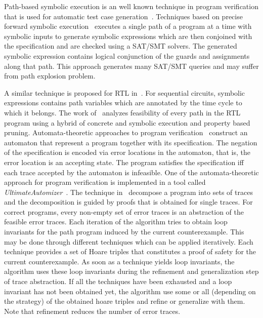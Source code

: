 %
Path-based symbolic execution is an well known technique in program verification 
that is used for automatic test case generation~\cite{DBLP:conf/osdi/CadarDE08}.
Techniques based on precise forward symbolic 
execution~\cite{DBLP:conf/osdi/CadarDE08, King:1976:SEP:360248.360252}
executes a single path of a program at a time with symbolic inputs 
to generate symbolic expressions which are then conjoined with
the specification and are checked using a SAT/SMT solvers. 
The generated symbolic expression contains logical conjunction 
of the guards and assignments along that path.  This approach generates many 
SAT/SMT queries and may suffer from path explosion problem.

A similar technique is proposed for RTL in~\cite{star}. 
For sequential circuits, symbolic expressions contains path variables which 
are annotated by the time cycle to which it belongs. The 
work of~\cite{DBLP:journals/todaes/LiuV14} analyzes 
feasibility of every path in the RTL program using a hybrid 
of concrete and symbolic execution and property based pruning.
%
%
Automata-theoretic approaches to program verification~\cite{DBLP:conf/cav/KupfermanV00,
DBLP:books/sp/cstoday95/Vardi95,DBLP:conf/cav/HeizmannHP13} construct 
an automaton that represent a program together with its specification.
The negation of the specification is encoded via error locations in the automaton, 
that is, the error location is an accepting state.  The program satisfies the 
specification iff each trace accepted by the automaton is infeasible.
%
One of the automata-theoretic approach for program verification 
is implemented in a tool called 
\emph{UltimateAutomizer}~\cite{DBLP:conf/tacas/HeizmannDGLMSP16}. 
The technique in~\cite{DBLP:conf/tacas/HeizmannDGLMSP16} decompose a 
program into sets of traces and the decomposition is guided by proofs that 
is obtained for single traces. For correct programs, every non-empty set 
of error traces is an abstraction of the feasible error traces.  
Each iteration of the algorithm tries to obtain loop invariants for the path program
induced by the current counterexample.  This may be done through different techniques 
which can be applied iteratively. Each technique provides a set of Hoare triples that constitutes a proof of
safety for the current counterexample.
As soon as a technique yields loop invariants, the algorithm uses these loop
invariants during the refinement and generalization step of trace abstraction.  If all the 
techniques have been exhausted and a loop invariant has not been obtained yet, the algorithm
use some or all (depending on the strategy) of the obtained hoare triples and 
refine or generalize with them.  Note that refinement reduces the number of error traces. 
